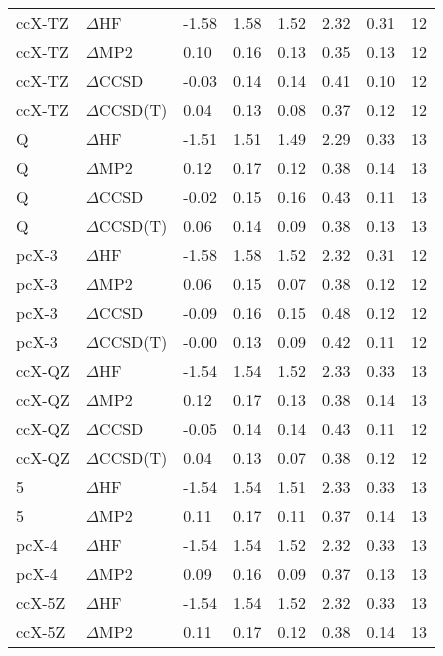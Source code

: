 \begin{table}
\begin{tabular}{l l l l l l l l }
    ccX-TZ & $\Delta$HF & -1.58 & 1.58 & 1.52 & 2.32 & 0.31 & 12 \\ 
    ccX-TZ & $\Delta$MP2 & 0.10 & 0.16 & 0.13 & 0.35 & 0.13 & 12 \\ 
    ccX-TZ & $\Delta$CCSD & -0.03 & 0.14 & 0.14 & 0.41 & 0.10 & 12 \\ 
    ccX-TZ & $\Delta$CCSD(T) & 0.04 & 0.13 & 0.08 & 0.37 & 0.12 & 12 \\ 
    Q & $\Delta$HF & -1.51 & 1.51 & 1.49 & 2.29 & 0.33 & 13 \\ 
    Q & $\Delta$MP2 & 0.12 & 0.17 & 0.12 & 0.38 & 0.14 & 13 \\ 
    Q & $\Delta$CCSD & -0.02 & 0.15 & 0.16 & 0.43 & 0.11 & 13 \\ 
    Q & $\Delta$CCSD(T) & 0.06 & 0.14 & 0.09 & 0.38 & 0.13 & 13 \\ 
    pcX-3 & $\Delta$HF & -1.58 & 1.58 & 1.52 & 2.32 & 0.31 & 12 \\ 
    pcX-3 & $\Delta$MP2 & 0.06 & 0.15 & 0.07 & 0.38 & 0.12 & 12 \\ 
    pcX-3 & $\Delta$CCSD & -0.09 & 0.16 & 0.15 & 0.48 & 0.12 & 12 \\ 
    pcX-3 & $\Delta$CCSD(T) & -0.00 & 0.13 & 0.09 & 0.42 & 0.11 & 12 \\ 
    ccX-QZ & $\Delta$HF & -1.54 & 1.54 & 1.52 & 2.33 & 0.33 & 13 \\ 
    ccX-QZ & $\Delta$MP2 & 0.12 & 0.17 & 0.13 & 0.38 & 0.14 & 13 \\ 
    ccX-QZ & $\Delta$CCSD & -0.05 & 0.14 & 0.14 & 0.43 & 0.11 & 12 \\ 
    ccX-QZ & $\Delta$CCSD(T) & 0.04 & 0.13 & 0.07 & 0.38 & 0.12 & 12 \\ 
    5 & $\Delta$HF & -1.54 & 1.54 & 1.51 & 2.33 & 0.33 & 13 \\ 
    5 & $\Delta$MP2 & 0.11 & 0.17 & 0.11 & 0.37 & 0.14 & 13 \\ 
    pcX-4 & $\Delta$HF & -1.54 & 1.54 & 1.52 & 2.32 & 0.33 & 13 \\ 
    pcX-4 & $\Delta$MP2 & 0.09 & 0.16 & 0.09 & 0.37 & 0.13 & 13 \\ 
    ccX-5Z & $\Delta$HF & -1.54 & 1.54 & 1.52 & 2.32 & 0.33 & 13 \\ 
    ccX-5Z & $\Delta$MP2 & 0.11 & 0.17 & 0.12 & 0.38 & 0.14 & 13 \\ 
    \bottomrule
  \end{tabular}
\end{table}
